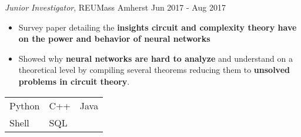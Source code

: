 \documentclass[a4paper,12pt]{memoir}
\begin{document}
\CVItem
	{\textit{Junior Investigator}, REUMass Amherst \hfill Jun 2017 - Aug 2017}
	{
		\begin{itemize}
			\item Survey paper detailing the \textbf{insights circuit and complexity theory have on the power and behavior of neural networks}
			\item Showed why \textbf{neural networks are hard to analyze} and understand on a theoretical level by compiling several theorems reducing them to \textbf{unsolved problems in circuit theory}.
		\end{itemize}
	}

\Sep







{
	\begin{tabular}{p{} p{} p{}}
		\bluebullet Python &  \bluebullet C++ & \bluebullet Java\\
		\bluebullet Shell &  \bluebullet SQL\\
	\end{tabular}
}
\end{document}
